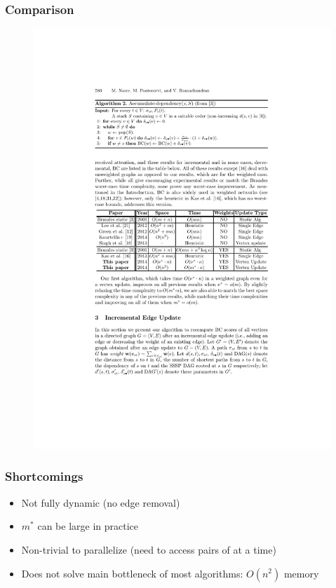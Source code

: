 \begin{frame}
  \frametitle{Comparison}

  \begin{figure}[H]
    \centering
    \includegraphics[width=\textwidth]{imgs/npr14-comparison}
  \end{figure}
\end{frame}


\begin{frame}
  \frametitle{Shortcomings}

  \begin{itemize}
    \item Not fully dynamic (no edge removal)
    \item $m^*$ can be large in practice
    \item Non-trivial to parallelize (need to access pairs of \sssp \dag at a time)
    \item Does not solve main bottleneck of most algorithms: $O(n^2)$ memory
  \end{itemize}
\end{frame}


